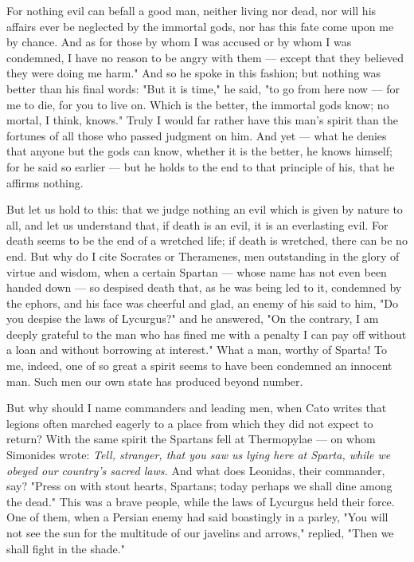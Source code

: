  For nothing evil can befall a good man, neither living nor dead, nor will his affairs ever be neglected by the immortal gods, nor has this fate come upon me by chance. And as for those by whom I was accused or by whom I was condemned, I have no reason to be angry with them — except that they believed they were doing me harm." And so he spoke in this fashion; but nothing was better than his final words: "But it is time," he said, "to go from here now — for me to die, for you to live on. Which is the better, the immortal gods know; no mortal, I think, knows." Truly I would far rather have this man's spirit than the fortunes of all those who passed judgment on him. And yet — what he denies that anyone but the gods can know, whether it is the better, he knows himself; for he said so earlier — but he holds to the end to that principle of his, that he affirms nothing.

 But let us hold to this: that we judge nothing an evil which is given by nature to all, and let us understand that, if death is an evil, it is an everlasting evil. For death seems to be the end of a wretched life; if death is wretched, there can be no end. But why do I cite Socrates or Theramenes, men outstanding in the glory of virtue and wisdom, when a certain Spartan — whose name has not even been handed down — so despised death that, as he was being led to it, condemned by the ephors, and his face was cheerful and glad, an enemy of his said to him, "Do you despise the laws of Lycurgus?" and he answered, "On the contrary, I am deeply grateful to the man who has fined me with a penalty I can pay off without a loan and without borrowing at interest." What a man, worthy of Sparta! To me, indeed, one of so great a spirit seems to have been condemned an innocent man. Such men our own state has produced beyond number.

 But why should I name commanders and leading men, when Cato writes that legions often marched eagerly to a place from which they did not expect to return? With the same spirit the Spartans fell at Thermopylae — on whom Simonides wrote: \textit{Tell, stranger, that you saw us lying here at Sparta, while we obeyed our country's sacred laws.} And what does Leonidas, their commander, say? "Press on with stout hearts, Spartans; today perhaps we shall dine among the dead." This was a brave people, while the laws of Lycurgus held their force. One of them, when a Persian enemy had said boastingly in a parley, "You will not see the sun for the multitude of our javelins and arrows," replied, "Then we shall fight in the shade."

